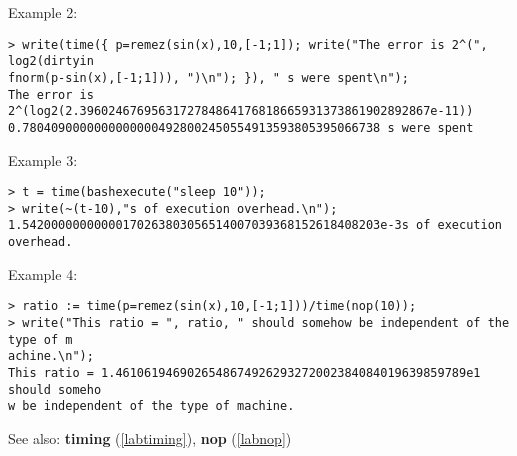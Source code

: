 \noindent Example 2: 
\begin{center}\begin{minipage}{15cm}\begin{Verbatim}[frame=single]
> write(time({ p=remez(sin(x),10,[-1;1]); write("The error is 2^(", log2(dirtyin
fnorm(p-sin(x),[-1;1])), ")\n"); }), " s were spent\n");
The error is 2^(log2(2.3960246769563172784864176818665931373861902892867e-11))
0.78040900000000000004928002450554913593805395066738 s were spent
\end{Verbatim}
\end{minipage}\end{center}
\noindent Example 3: 
\begin{center}\begin{minipage}{15cm}\begin{Verbatim}[frame=single]
> t = time(bashexecute("sleep 10"));
> write(~(t-10),"s of execution overhead.\n");
1.54200000000000170263803056514007039368152618408203e-3s of execution overhead.
\end{Verbatim}
\end{minipage}\end{center}
\noindent Example 4: 
\begin{center}\begin{minipage}{15cm}\begin{Verbatim}[frame=single]
> ratio := time(p=remez(sin(x),10,[-1;1]))/time(nop(10));
> write("This ratio = ", ratio, " should somehow be independent of the type of m
achine.\n");
This ratio = 1.4610619469026548674926293272002384084019639859789e1 should someho
w be independent of the type of machine.
\end{Verbatim}
\end{minipage}\end{center}
See also: \textbf{timing} (\ref{labtiming}), \textbf{nop} (\ref{labnop})
